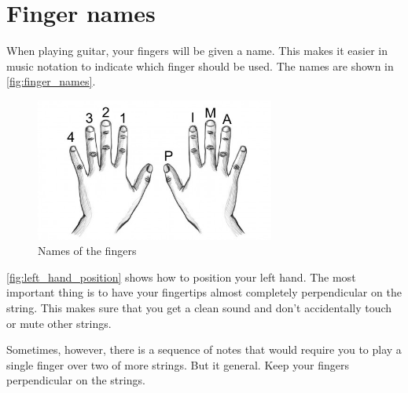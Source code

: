 \section{Finger names}

When playing guitar, your fingers will be given a name. This makes it easier in music notation to indicate which finger should be used. The names are shown in \autoref{fig:finger_names}.

\begin{figure}[h]
    \centering
    \includegraphics[width=0.7\textwidth]{../../Images/guitar-finger-tips_pima.jpg}
    \caption{Names of the fingers \cite{FingerNames}}
    \label{fig:finger_names}
\end{figure}

\autoref{fig:left_hand_position} shows how to position your left hand. The most important thing is to have your fingertips almost completely perpendicular on the string. This makes sure that you get a clean sound and don't accidentally touch or mute other strings.

Sometimes, however, there is a sequence of notes that would require you to play a single finger over two of more strings. But it general. Keep your fingers perpendicular on the strings.


